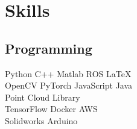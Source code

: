 \documentclass[letterpaper]{deedy-resume} %
\begin{document}
\begin{minipage}[t]{0.25\textwidth}
\sectionspace %


\section{Skills}

\subsection{Programming}

Python \textbullet{} C++ \textbullet{} Matlab \textbullet{}ROS \textbullet{} \LaTeX\ \\ 
\sectionspace
{}
OpenCV \textbullet{} PyTorch \textbullet{} JavaScript \textbullet{} Java \\
Point Cloud Library \\
\sectionspace
{}
TensorFlow \textbullet{} Docker \textbullet{} AWS \\
Solidworks \textbullet{} Arduino


\sectionspace %


\end{minipage} %
\hfill
%
%
\end{document}
